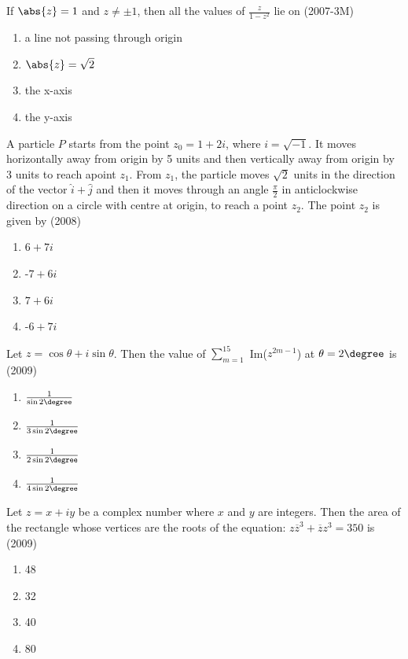 \item If $\abs{z}=1$ and $z\neq\pm1$, then all the values of $\frac{z}{1-z^{2}}$ lie on \hfill{(2007-3M)}
\begin{enumerate}
	\item a line not passing through origin
	\item $\abs{z}=\sqrt{2}$
	\item the x-axis
	\item the y-axis
\end{enumerate}

\item A particle $P$ starts from the point $z_{0}=1+2i$, where $i=\sqrt{-1}$. It moves horizontally away from origin by 5 units and then vertically away from origin by 3 units to reach apoint $z_{1}$. From $z_{1}$, the particle moves $\sqrt{2}$ units in the direction of the vector $\hat{i}+\hat{j}$ and then it moves through an angle $\frac{\pi}{2}$ in anticlockwise direction on a circle with centre at origin, to reach a point $z_{2}$. The point $z_{2}$ is given by \hfill{(2008)}
	\begin{multicols}{2}
\begin{enumerate}
	\item $6+7i$
	\item -$7+6i$
	\item $7+6i$
	\item -$6+7i$
\end{enumerate}
	\end{multicols}

\item Let $z=\cos\theta+i\sin\theta$. Then the value of $\sum_{m=1} ^{15}$ Im($z^{2m-1}$) at $\theta=2\degree$ is \hfill{(2009)}
	\begin{multicols}{4}
\begin{enumerate}
	\item $\frac{1}{\sin 2\degree}$
	\item $\frac{1}{3\sin 2\degree}$
	\item $\frac{1}{2\sin 2\degree}$
	\item $\frac{1}{4\sin 2\degree}$
\end{enumerate}
	\end{multicols}

\item Let $z=x+iy$ be a complex number where $x$ and $y$ are integers. Then the area of the rectangle whose vertices are the roots of the equation: $z\overline{z}^{3}+\overline{z}z^{3}=350$ is \hfill{(2009)}
	\begin{multicols}{4}
\begin{enumerate}
	\item 48
	\item 32
	\item 40
	\item 80
\end{enumerate}
	\end{multicols}

